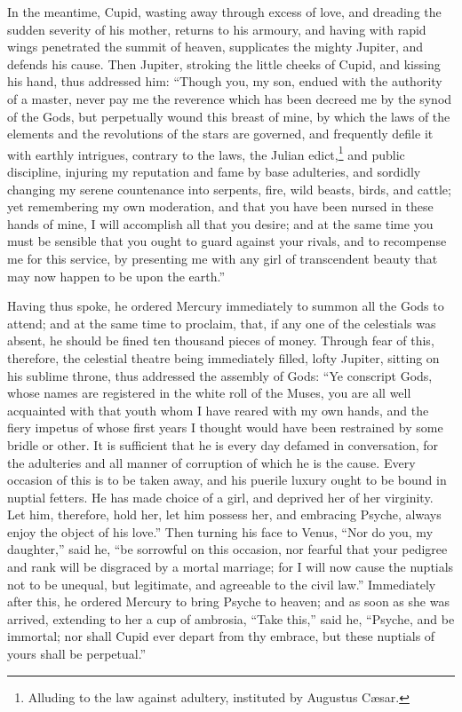 \documentclass[12pt]{article}
\begin{document}
In the meantime, Cupid, wasting away through excess of love, and dreading the
sudden severity of his mother, returns to his armoury, and having with rapid
wings penetrated the summit of heaven, supplicates the mighty Jupiter, and
defends his cause. Then Jupiter, stroking the little cheeks of Cupid, and
kissing his hand, thus addressed him: ``Though you, my son, endued with the
authority of a master, never pay me the reverence which has been decreed me by
the synod of the Gods, but perpetually wound this breast of mine, by which the
laws of the elements and the revolutions of the stars are governed, and
frequently defile it with earthly intrigues, contrary to the laws, the Julian
edict,\footnote{Alluding to the law against adultery, instituted by Augustus
C{\ae}sar.} and public discipline, injuring my reputation and fame by base
adulteries, and sordidly changing my serene countenance into serpents, fire,
wild beasts, birds, and cattle; yet remembering my own moderation, and that you
have been nursed in these hands of mine, I will accomplish all that you desire;
and at the same time you must be sensible that you ought to guard against your
rivals, and to recompense me for this service, by presenting me with any girl
of transcendent beauty that may now happen to be upon the earth.''

Having thus spoke, he ordered Mercury immediately to summon all the Gods to
attend; and at the same time to proclaim, that, if any one of the celestials
was absent, he should be fined ten thousand pieces of money. Through fear of
this, therefore, the celestial theatre being immediately filled, lofty Jupiter,
sitting on his sublime throne, thus addressed the assembly of Gods: ``Ye
conscript Gods, whose names are registered in the white roll of the Muses, you
are all well acquainted with that youth whom I have reared with my own hands,
and the fiery impetus of whose first years I thought would have been restrained
by some bridle or other. It is sufficient that he is every day defamed in
conversation, for the adulteries and all manner of corruption of which he is
the cause. Every occasion of this is to be taken away, and his puerile luxury
ought to be bound in nuptial fetters. He has made choice of a girl, and
deprived her of her virginity. Let him, therefore, hold her, let him possess
her, and embracing Psyche, always enjoy the object of his love.'' Then turning
his face to Venus, ``Nor do you, my daughter,'' said he, ``be sorrowful on this
occasion, nor fearful that your pedigree and rank will be disgraced by a mortal
marriage; for I will now cause the nuptials not to be unequal, but legitimate,
and agreeable to the civil law.'' Immediately after this, he ordered Mercury to
bring Psyche to heaven; and as soon as she was arrived, extending to her a cup
of ambrosia, ``Take this,'' said he, ``Psyche, and be immortal; nor shall Cupid
ever depart from thy embrace, but these nuptials of yours shall be perpetual.''
\end{document}
